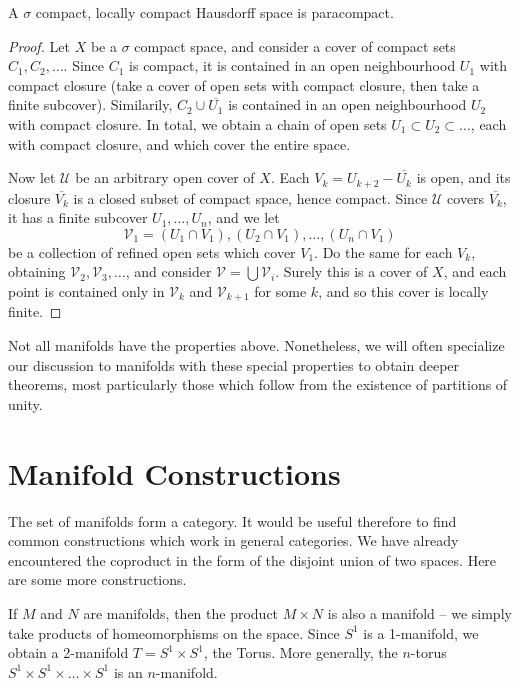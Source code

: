 \begin{lemma}[$1) \to (4$]
    A $\sigma$ compact, locally compact Hausdorff space is paracompact.
\end{lemma}
\begin{proof}
    Let $X$ be a $\sigma$ compact space, and consider a cover of compact sets $C_1, C_2, \dots$. Since $C_1$ is compact, it is contained in an open neighbourhood $U_1$ with compact closure (take a cover of open sets with compact closure, then take a finite subcover). Similarily, $C_2 \cup \overline{U_1}$ is contained in an open neighbourhood $U_2$ with compact closure. In total, we obtain a chain of open sets $U_1 \subset U_2 \subset \dots$, each with compact closure, and which cover the entire space.

    Now let $\mathcal{U}$ be an arbitrary open cover of $X$. Each $V_k = U_{k+2} - \overline{U_k}$ is open, and its closure $\overline{V_k}$ is a closed subset of compact space, hence compact. Since $\mathcal{U}$ covers $\overline{V_k}$, it has a finite subcover $U_1, \dots, U_n$, and we let
    \[ \mathcal{V}_1 = (U_1 \cap V_1), (U_2 \cap V_1), \dots, (U_n \cap V_1) \]
    be a collection of refined open sets which cover $V_1$. Do the same for each $V_k$, obtaining $\mathcal{V}_2, \mathcal{V}_3, \dots$, and consider $\mathcal{V} = \bigcup \mathcal{V}_i$. Surely this is a cover of $X$, and each point is contained only in $\mathcal{V}_k$ and $\mathcal{V}_{k+1}$ for some $k$, and so this cover is locally finite.
\end{proof}

Not all manifolds have the properties above. Nonetheless, we will often specialize our discussion to manifolds with these special properties to obtain deeper theorems, most particularly those which follow from the existence of partitions of unity.

\section{Manifold Constructions}

The set of manifolds form a category. It would be useful therefore to find common constructions which work in general categories. We have already encountered the coproduct in the form of the disjoint union of two spaces. Here are some more constructions.

\begin{example}
    If $M$ and $N$ are manifolds, then the product $M \times N$ is also a manifold -- we simply take products of homeomorphisms on the space. Since $S^1$ is a 1-manifold, we obtain a 2-manifold $T = S^1 \times S^1$, the Torus. More generally, the $n$-torus $S^1 \times S^1 \times \dots \times S^1$ is an $n$-manifold.
\end{example}

